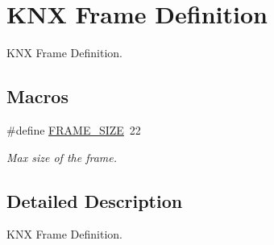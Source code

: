 \hypertarget{group___k_n_x___frame}{}\section{K\+NX Frame Definition}
\label{group___k_n_x___frame}


K\+NX Frame Definition.  


\subsection*{Macros}
\begin{DoxyCompactItemize}
\item 
\#define \hyperlink{group___k_n_x___frame_gaf9b1b2ba12857a4bf11289dac8c5462d}{F\+R\+A\+M\+E\+\_\+\+S\+I\+ZE}~22\hypertarget{group___k_n_x___frame_gaf9b1b2ba12857a4bf11289dac8c5462d}{}\label{group___k_n_x___frame_gaf9b1b2ba12857a4bf11289dac8c5462d}

\begin{DoxyCompactList}\small\item\em Max size of the frame. \end{DoxyCompactList}\end{DoxyCompactItemize}


\subsection{Detailed Description}
K\+NX Frame Definition. 

